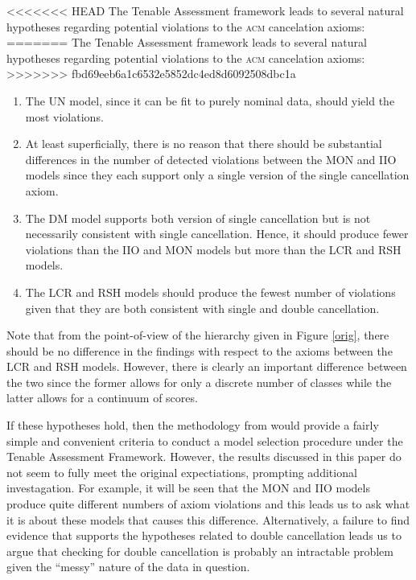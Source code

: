 \documentclass[12pt]{article}
\begin{document}
<<<<<<< HEAD
The Tenable Assessment framework  leads to several natural hypotheses regarding potential violations to the \textsc{acm} cancelation axioms:
=======
The Tenable Assessment framework \citep{torres2012} leads to several natural hypotheses regarding potential violations to the \textsc{acm} cancelation axioms:
>>>>>>> fbd69eeb6a1c6532e5852dc4ed8d6092508dbc1a
\begin{enumerate}
\item The UN model, since it can be fit to purely nominal data, should yield the most violations.
\item At least superficially, there is no reason that there should be substantial differences in the number of detected violations between the MON and IIO models since they each support only a single version of the single cancellation axiom.
\item The DM model supports both version of single cancellation but is not necessarily consistent with single cancellation. Hence, it should produce fewer violations than the IIO and MON models but more than the LCR and RSH models.
\item The LCR and RSH models should produce the fewest number of violations given that they are both consistent with single and double cancellation.
\end{enumerate}
Note that from the point-of-view of the hierarchy given in Figure \ref{orig}, there should be no difference in the findings with respect to the axioms between the LCR and RSH models. However, there is clearly an important difference between the two since the former allows for only a discrete number of classes while the latter allows for a continuum of scores. 

If these hypotheses hold, then the methodology from  would provide a fairly simple and convenient criteria to conduct a model selection procedure under the Tenable Assessment Framework. However, the results discussed in this paper do not seem to fully meet the original expectiations, prompting additional investagation. For example, it will be seen that the MON and IIO models produce quite different numbers of axiom violations and this leads us to ask what it is about these models that causes this difference. Alternatively, a failure to find evidence that supports the hypotheses related to double cancellation leads us to argue that checking for double cancellation is probably an intractable problem given the ``messy'' nature of the data in question.
\end{document}
